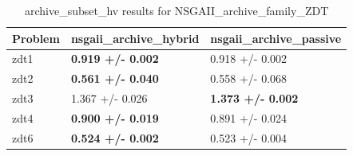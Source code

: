 \begin{table}
\caption{archive_subset_hv results for NSGAII_archive_family_ZDT}
\label{NSGAII_archive_family_ZDT_archive_subset_hv}
\begin{tabular}{lll}
\toprule
Problem & nsgaii_archive_hybrid & nsgaii_archive_passive \\
\midrule
zdt1 & \textbf{0.919 +/- 0.002} & 0.918 +/- 0.002 \\
zdt2 & \textbf{0.561 +/- 0.040} & 0.558 +/- 0.068 \\
zdt3 & 1.367 +/- 0.026 & \textbf{1.373 +/- 0.002} \\
zdt4 & \textbf{0.900 +/- 0.019} & 0.891 +/- 0.024 \\
zdt6 & \textbf{0.524 +/- 0.002} & 0.523 +/- 0.004 \\
\bottomrule
\end{tabular}
\end{table}

